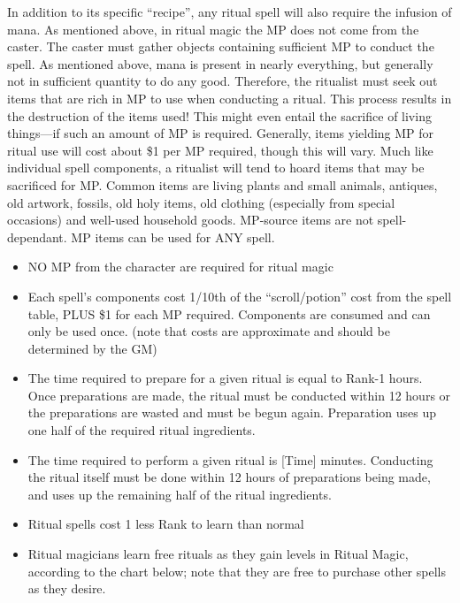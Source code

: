 In addition to its specific ``recipe'', any ritual spell will also
require the infusion of mana.  As mentioned above, in ritual magic the
MP does not come from the caster.  The caster must gather objects
containing sufficient MP to conduct the spell.  As mentioned above,
mana is present in nearly everything, but generally not in sufficient
quantity to do any good.  Therefore, the ritualist must seek out items
that are rich in MP to use when conducting a ritual.  This process
results in the destruction of the items used!  This might even entail
the sacrifice of living things---if such an amount of MP is required.
Generally, items yielding MP for ritual use will cost about \$1 per MP
required, though this will vary.  Much like individual spell
components, a ritualist will tend to hoard items that may be
sacrificed for MP.  Common items are living plants and small animals,
antiques, old artwork, fossils, old holy items, old clothing
(especially from special occasions) and well-used household goods.
MP-source items are not spell-dependant.  MP items can be used for ANY
spell.

\begin{itemize}
\item NO MP from the character are required for ritual magic
\item Each spell's components cost 1/10th of the ``scroll/potion''
  cost from the spell table, PLUS \$1 for each MP required.
  Components are consumed and can only be used once.  (note that costs
  are approximate and should be determined by the GM)
\item The time required to prepare for a given ritual is equal to
  Rank-1 hours.  Once preparations are made, the ritual must be
  conducted within 12 hours or the preparations are wasted and must be
  begun again.  Preparation uses up one half of the required ritual
  ingredients.
\item The time required to perform a given ritual is [Time] minutes.
  Conducting the ritual itself must be done within 12 hours of
  preparations being made, and uses up the remaining half of the
  ritual ingredients.
\item	Ritual spells cost 1 less Rank to learn than normal
\item Ritual magicians learn free rituals as they gain levels in
  Ritual Magic, according to the chart below; note that they are free
  to purchase other spells as they desire.
\end{itemize}


